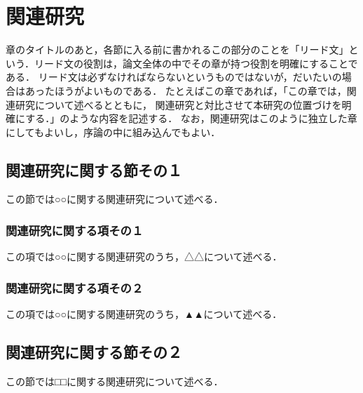 \chapter{関連研究}	%

章のタイトルのあと，各節に入る前に書かれるこの部分のことを「リード文」という．リード文の役割は，論文全体の中でその章が持つ役割を明確にすることである．
リード文は必ずなければならないというものではないが，だいたいの場合はあったほうがよいものである．
たとえばこの章であれば，「この章では，関連研究について述べるとともに，
関連研究と対比させて本研究の位置づけを明確にする．」のような内容を記述する．
なお，関連研究はこのように独立した章にしてもよいし，序論の中に組み込んでもよい．

\section{関連研究に関する節その１}
この節では○○に関する関連研究について述べる．

\subsection{関連研究に関する項その１}
この項では○○に関する関連研究のうち，△△について述べる．

\subsection{関連研究に関する項その２}
この項では○○に関する関連研究のうち，▲▲について述べる．

\section{関連研究に関する節その２}
この節では□□に関する関連研究について述べる．


